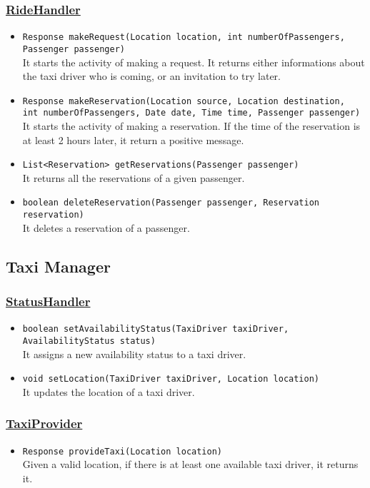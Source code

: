 \subsubsection{\underline{RideHandler}}
\begin{itemize}
	\item \texttt{Response makeRequest(Location location, int numberOfPassengers,\\ Passenger passenger)}\\
	It starts the activity of making a request. It returns either informations about the taxi driver who is coming, or an invitation to try later.
	\item \texttt{Response makeReservation(Location source, Location destination, \\ int numberOfPassengers, Date date, Time time, Passenger passenger)}\\
	It starts the activity of making a reservation. If the time of the reservation is at least 2 hours later, it return a positive message.
	\item \texttt{List<Reservation> getReservations(Passenger passenger)}\\
	It returns all the reservations of a given passenger.
	\item \texttt{boolean deleteReservation(Passenger passenger, Reservation reservation)}\\
	It deletes a reservation of a passenger.
\end{itemize}
\subsection{Taxi Manager}
\subsubsection{\underline{StatusHandler}}
\begin{itemize}
	\item \texttt{boolean setAvailabilityStatus(TaxiDriver taxiDriver, AvailabilityStatus status)}\\
	It assigns a new availability status to a taxi driver.
	\item \texttt{void setLocation(TaxiDriver taxiDriver, Location location)}\\
	It updates the location of a taxi driver.
\end{itemize}
\subsubsection{\underline{TaxiProvider}}
\begin{itemize}
	\item \texttt{Response provideTaxi(Location location)}\\
	Given a valid location, if there is at least one available taxi driver, it returns it.
\end{itemize}
